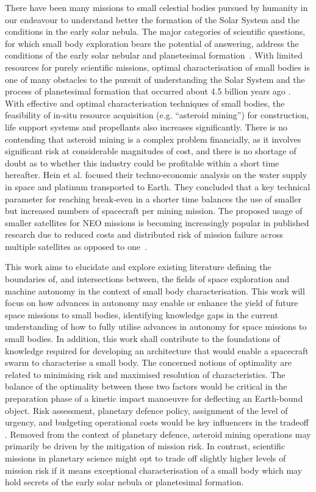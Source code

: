 There have been many missions to small celestial bodies pursued by humanity in our endeavour to understand better the formation of the Solar System and the conditions in the early solar nebula. The major categories of scientific questions, for which small body exploration bears the potential of answering, address the conditions of the early solar nebular and planetesimal formation~\cite{Davidsson2021}. With limited resources for purely scientific missions, optimal characterisation of small bodies is one of many obstacles to the pursuit of understanding the Solar System and the process of planetesimal formation that occurred about 4.5 billion years ago \cite{Klahr2015}. With effective and optimal characterisation techniques of small bodies, the feasibility of in-situ resource acquisition (e.g. “asteroid mining”) for construction, life support systems and propellants also increases significantly. There is no contending that asteroid mining is a complex problem financially, as it involves significant risk at considerable magnitudes of cost, and there is no shortage of doubt as to whether this industry could be profitable within a short time hereafter. Hein et al. \cite{Hein2020} focused their techno-economic analysis on the water supply in space and platinum transported to Earth. They concluded that a key technical parameter for reaching break-even in a shorter time balances the use of smaller but increased numbers of spacecraft per mining mission. The proposed usage of smaller satellites for NEO missions is becoming increasingly popular in published research due to reduced costs and distributed risk of mission failure across multiple satellites as opposed to one~\cite{Wells2006, Laurin2008, Scott2013, Yu2014}. 

This work aims to elucidate and explore existing literature defining the boundaries of, and intersections between, the fields of space exploration and machine autonomy in the context of small body characterisation. This work will focus on how advances in autonomy may enable or enhance the yield of future space missions to small bodies, identifying knowledge gaps in the current understanding of how to fully utilise advances in autonomy for space missions to small bodies. In addition, this work shall contribute to the foundations of knowledge required for developing an architecture that would enable a spacecraft swarm to characterise a small body. The concerned notions of optimality are related to minimising risk and maximised resolution of characteristics. The balance of the optimality between these two factors would be critical in the preparation phase of a kinetic impact manoeuvre for deflecting an Earth-bound object. Risk assessment, planetary defence policy, assignment of the level of urgency, and budgeting operational costs would be key influencers in the tradeoff \cite{Marks2022}. Removed from the context of planetary defence, asteroid mining operations may primarily be driven by the mitigation of mission risk. In contrast, scientific missions in planetary science might opt to trade off slightly higher levels of mission risk if it means exceptional characterisation of a small body which may hold secrets of the early solar nebula or planetesimal formation.


